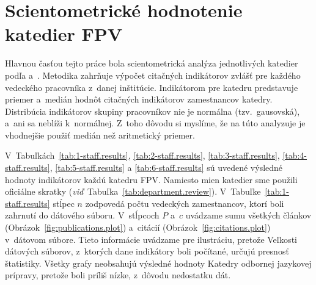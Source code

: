 \section{Scientometrické hodnotenie katedier FPV}

Hlavnou časťou tejto práce bola scientometrická analýza jednotlivých katedier
podľa \citet{Kazakis2014a} a~\citet{Kazakis2014b,Kazakis2015}.  Metodika
zahrňuje výpočet citačných indikátorov zvlášť pre každého vedeckého pracovníka
z~danej inštitúcie.  Indikátorom pre katedru predstavuje priemer a~medián hodnôt
citačných indikátorov zamestnancov katedry.  Distribúcia indikátorov skupiny
pracovníkov nie je normálna (tzv.~gausovská), a~ani sa neblíži k~normálnej.
Z~toho dôvodu si myslíme, že na túto analyzuje je vhodnejšie použiť medián než
aritmetický priemer.

V~Tabuľkách~\ref{tab:1-staff.results}, \ref{tab:2-staff.results},
\ref{tab:3-staff.results}, \ref{tab:4-staff.results}, \ref{tab:5-staff.results}
a \ref{tab:6-staff.results} sú uvedené výsledné hodnoty indikátorov každú
katedru FPV.  Namiesto mien katedier sme použili oficiálne skratky
(\emph{viď}~Tabuľka~\ref{tab:department.review}).
V~Tabuľke~\ref{tab:1-staff.results} stĺpec $n$ zodpovedá počtu vedeckých
zamestnancov, ktorí boli zahrnutí do dátového súboru.  V~stĺpcoch $P$ a~$c$
uvádzame sumu všetkých článkov (Obrázok~\ref{fig:publications.plot}) a~citácií
(Obrázok~\ref{fig:citations.plot}) v~dátovom súbore.  Tieto informácie uvádzame
pre ilustráciu, pretože Veľkosti dátových súborov, z~ktorých dane indikátory
boli počítané, určujú presnosť štatistiky.  Všetky grafy neobsahujú výsledné
hodnoty Katedry odbornej jazykovej prípravy, pretože boli príliš nízke, z~dôvodu
nedostatku dát.

